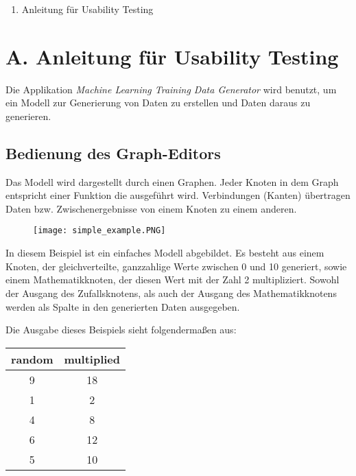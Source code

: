 
\addchap{\langanhang} 

{\Large
\begin{enumerate}[label=\Alph*.]
	\item Anleitung für Usability Testing
\end{enumerate}
}
\pagebreak
\section*{A. Anleitung für Usability Testing}
\label{apx:manual}
Die Applikation \textit{Machine Learning Training Data Generator} wird benutzt, um ein Modell zur Generierung von Daten zu erstellen und Daten daraus zu generieren.

\subsection*{Bedienung des Graph-Editors}

Das Modell wird dargestellt durch einen Graphen. Jeder Knoten in dem Graph entspricht einer Funktion die ausgeführt wird. Verbindungen (Kanten) übertragen Daten bzw. Zwischenergebnisse von einem Knoten zu einem anderen.

\begin{figure}[H]
    \centering
    \texttt{[image: simple\_example.PNG]}
\end{figure}

In diesem Beispiel ist ein einfaches Modell abgebildet. Es besteht aus einem Knoten, der gleichverteilte, ganzzahlige Werte zwischen 0 und 10 generiert, sowie einem Mathematikknoten, der diesen Wert mit der Zahl 2 multipliziert. Sowohl der Ausgang des Zufallsknotens, als auch der Ausgang des Mathematikknotens werden als Spalte in den generierten Daten ausgegeben.

Die Ausgabe dieses Beispiels sieht folgendermaßen aus:
\begin{table}[H]
    \centering
    \setlength\extrarowheight{-5pt}
    \begin{tabular}{ | c | c | }
        \hline
        random & multiplied \\
        \hline
        9 & 18 \\
        1 & 2 \\
        4 & 8 \\
        6 & 12 \\
        5 & 10 \\
        \hline
    \end{tabular}
\end{table}

